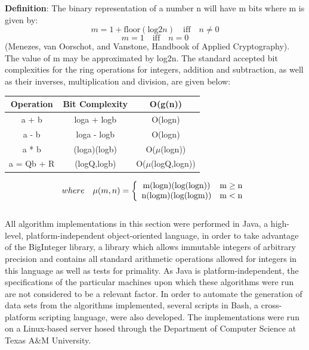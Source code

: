 \documentclass[11pt]{article}
\begin{document}
\textbf{Definition}: The binary representation of a number n will have m bits where m is given by:
	$$m = 1 + \mathrm{floor}(\mathrm{log}2n)\quad \mathrm{iff}\quad n \neq 0$$
	$$m = 1\quad \mathrm{iff}\quad n = 0$$
	(Menezes, van Oorschot, and Vanstone, Handbook of Applied Cryptography).\\
\indent The value of m may be approximated by log2n. The standard accepted bit complexities for the ring operations for integers, addition and subtraction, as well as their inverses, multiplication and division, are given below:
\begin{center}
\begin{tabular}{c|c|c}

	Operation & Bit Complexity & O(g(n))\\
	\hline
	a + b &  loga + logb & O(logn)\\
	a - b &  loga - logb & O(logn)\\
	a * b &  (loga)(logb) & O($\mu$(logn))\\
	
	a = Qb + R & (logQ,logb) & O($\mu$(logQ,logn))
	
\end{tabular}
\end{center}
\begin{displaymath} where \quad \mu(m,n) = \left\{
	\begin{array}{c c}
	\mathrm{m(logn)(log(logn))} & \mathrm{m} \geq \mathrm{n}\\
	\mathrm{n(logm)(log(logm))} & \mathrm{m} < \mathrm{n}\\
	\end{array}
	\right. 
\end{displaymath}
\\
\indent 
All algorithm implementations in this section were performed in Java, a high-level, platform-independent object-oriented language, in order to take advantage of the BigInteger library, a library which allows immutable integers of arbitrary precision and contains all standard arithmetic operations allowed for integers in this language as well as tests for primality. As Java is platform-independent, the specifications of the particular machines upon which these algorithms were run are not considered to be a relevant factor. In order to automate the generation of data sets from the algorithms implemented, several scripts in Bash, a cross-platform scripting language, were also developed. The implementations were run on a Linux-based server hosed through the Department of Computer Science at Texas A$\&$M University.\\
\end{document}
